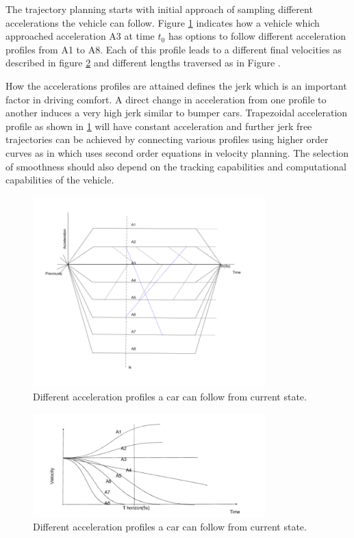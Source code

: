 The trajectory planning starts with initial approach of sampling different accelerations the vehicle can follow. Figure \ref{accelerations} indicates how a vehicle which approached acceleration A3 at time $t_0$ has options to follow different acceleration profiles from A1 to A8. Each of this profile leads to a different final velocities as described in figure \ref{velcoities} and different lengths traversed as in Figure . 

How the accelerations profiles are attained defines the jerk which is an important factor in driving comfort. A direct change in acceleration from one profile to another induces a very high jerk similar to bumper cars. Trapezoidal acceleration profile as shown in \ref{accelerations} will have constant acceleration and further jerk free trajectories can be achieved by connecting various profiles using higher order curves as in \cite{diss_shui_phd_thesis} which uses second order equations in velocity planning. The selection of smoothness should also depend on the tracking capabilities and computational capabilities of the vehicle. 

 \begin{figure}[H]
    \centering
    \includegraphics[width=0.8\textwidth]{Images/accelerations.png}
    \caption{Different acceleration profiles a car can follow from current state.}
    \label{accelerations}
\end{figure}

 \begin{figure}[H]
    \centering
    \includegraphics[width=0.8\textwidth]{Images/velcoities.png}
    \caption{Different acceleration profiles a car can follow from current state.}
    \label{velcoities}
\end{figure}

